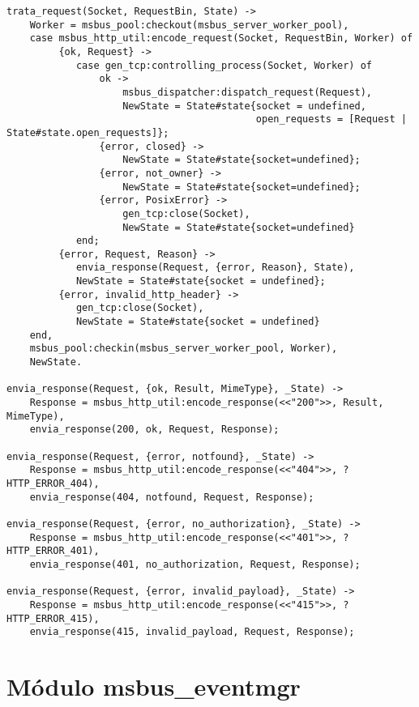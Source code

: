 \begin{lstlisting}
trata_request(Socket, RequestBin, State) -> 
	Worker = msbus_pool:checkout(msbus_server_worker_pool),
	case msbus_http_util:encode_request(Socket, RequestBin, Worker) of
		 {ok, Request} -> 
			case gen_tcp:controlling_process(Socket, Worker) of
				ok -> 
					msbus_dispatcher:dispatch_request(Request),
					NewState = State#state{socket = undefined, 
										   open_requests = [Request | State#state.open_requests]};
				{error, closed} -> 
					NewState = State#state{socket=undefined};
				{error, not_owner} -> 
					NewState = State#state{socket=undefined};
				{error, PosixError} ->
					gen_tcp:close(Socket),
					NewState = State#state{socket=undefined}
			end;
		 {error, Request, Reason} -> 
			envia_response(Request, {error, Reason}, State),
			NewState = State#state{socket = undefined};
		 {error, invalid_http_header} -> 
			gen_tcp:close(Socket),
			NewState = State#state{socket = undefined}
	end,
	msbus_pool:checkin(msbus_server_worker_pool, Worker),
	NewState.

envia_response(Request, {ok, Result, MimeType}, _State) ->
	Response = msbus_http_util:encode_response(<<"200">>, Result, MimeType),
	envia_response(200, ok, Request, Response);

envia_response(Request, {error, notfound}, _State) ->
	Response = msbus_http_util:encode_response(<<"404">>, ?HTTP_ERROR_404),
	envia_response(404, notfound, Request, Response);

envia_response(Request, {error, no_authorization}, _State) ->
	Response = msbus_http_util:encode_response(<<"401">>, ?HTTP_ERROR_401),
	envia_response(401, no_authorization, Request, Response);

envia_response(Request, {error, invalid_payload}, _State) ->
	Response = msbus_http_util:encode_response(<<"415">>, ?HTTP_ERROR_415),
	envia_response(415, invalid_payload, Request, Response);

\end{lstlisting}


\section{Módulo msbus\_eventmgr}


